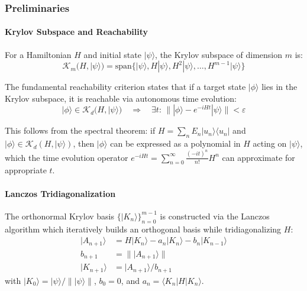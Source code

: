 \documentclass[ a4paper, 
                amsfonts, 
                amssymb, 
                amsmath, 
                reprint, 
                showkeys, 
                nofootinbib,
                superscriptaddress, 
                onecolumn, 
                notitlepage,
                aps,
                pra,
                longbibliography]{revtex4-1}
\theoremstyle{definition}
\begin{document}
\subsubsection{Preliminaries}

\paragraph{Krylov Subspace and Reachability}

For a Hamiltonian $H$ and initial state $|\psi\rangle$, the Krylov subspace of dimension $m$ is:
\begin{equation}
\mathcal{K}_m(H, |\psi\rangle) = \text{span}\{|\psi\rangle, H|\psi\rangle, H^2|\psi\rangle, \ldots, H^{m-1}|\psi\rangle\}
\label{eq:krylov_subspace}
\end{equation}

The fundamental reachability criterion states that if a target state $|\phi\rangle$ lies in the Krylov subspace, it is reachable via autonomous time evolution:
\begin{equation}
|\phi\rangle \in \mathcal{K}_d(H, |\psi\rangle) \quad \Rightarrow \quad \exists t: \, \||\phi\rangle - e^{-iHt}|\psi\rangle\| < \varepsilon
\label{eq:krylov_reachability}
\end{equation}

This follows from the spectral theorem: if $H = \sum_n E_n |u_n\rangle\langle u_n|$ and $|\phi\rangle \in \mathcal{K}_d(H, |\psi\rangle)$, then $|\phi\rangle$ can be expressed as a polynomial in $H$ acting on $|\psi\rangle$, which the time evolution operator $e^{-iHt} = \sum_{n=0}^\infty \frac{(-it)^n}{n!} H^n$ can approximate for appropriate $t$.

\paragraph{Lanczos Tridiagonalization}

The orthonormal Krylov basis $\{|K_n\rangle\}_{n=0}^{m-1}$ is constructed via the Lanczos algorithm \cite{koch_lanczos, Rabinovici_2021} which iteratively builds an orthogonal basis while tridiagonalizing $H$:
\begin{align}
|A_{n+1}\rangle &= H|K_n\rangle - a_n|K_n\rangle - b_n|K_{n-1}\rangle \\
b_{n+1} &= \||A_{n+1}\rangle\| \\
|K_{n+1}\rangle &= |A_{n+1}\rangle/b_{n+1}
\end{align}
with $|K_0\rangle = |\psi\rangle/\||\psi\rangle\|$, $b_0 = 0$, and $a_n = \langle K_n | H | K_n \rangle$.
\end{document}
